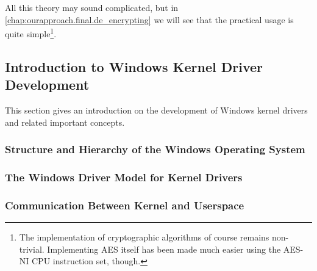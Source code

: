All this theory may sound complicated, but in \autoref{chap:ourapproach.final.de_encrypting} we will see that the practical usage is quite simple\footnote{\label{fn:background.luks2.simplecryptography} The implementation of cryptographic algorithms of course remains non-trivial. Implementing AES itself has been made much easier using the AES-NI CPU instruction set, though.}.

\subsection{Introduction to Windows Kernel Driver Development}
\label{chap:background.kerneldriver}
This section gives an introduction on the development of Windows kernel drivers and related important concepts.

\subsubsection{Structure and Hierarchy of the Windows Operating System}
\label{chap:background.kerneldriver.oshierarchy}

\subsubsection{The Windows Driver Model for Kernel Drivers}
\label{chap:background.kerneldriver.wdm}

\subsubsection{Communication Between Kernel and Userspace}
\label{chap:background.kerneldriver.communication}
